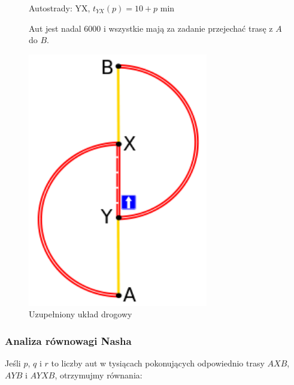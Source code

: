 \documentclass[twoside,12pt]{report}
\begin{document}
\vspace*{60px}
\begin{figure}[h]
\begin{flushleft}
\begin{minipage}{.50\textwidth}
Autostrady:\newline
YX, $t_{YX}(p) =  10 + p$ min\newline

\vspace*{15px}
Aut jest nadal 6000 i wszystkie mają za zadanie przejechać trasę z $A$ do $B$.
\end{minipage}%
\end{flushleft}
\begin{flushright}
	\begin{minipage}{.50\textwidth}
	\centering
	\includegraphics[width=0.7\textwidth]{img/braess2}
	\caption{Uzupełniony układ drogowy}
	\end{minipage}
\end{flushright}
\end{figure}

\subsubsection{Analiza równowagi Nasha}

Jeśli $p$, $q$ i $r$ to liczby aut w tysiącach pokonujących odpowiednio trasy $AXB$, $AYB$ i $AYXB$, otrzymujmy równania:
\end{document}
